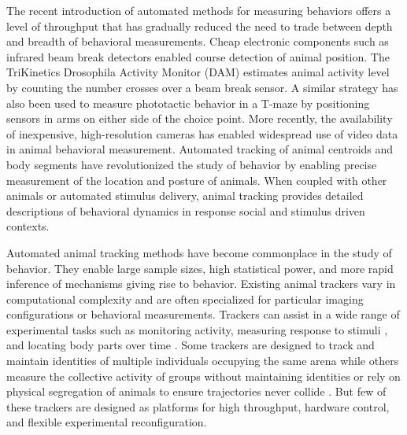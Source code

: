 \documentclass[12pt,letterpaper]{article}
\begin{document}
The recent introduction of automated methods for measuring behaviors offers a level of throughput that has gradually reduced the need to trade between depth and breadth of behavioral measurements. Cheap electronic components such as infrared beam break detectors enabled course detection of animal position. The TriKinetics Drosophila Activity Monitor (DAM) estimates animal activity level by counting the number crosses over a beam break sensor. A similar strategy has also been used to measure phototactic behavior in a T-maze by positioning sensors in arms on either side of the choice point. More recently, the availability of inexpensive, high-resolution cameras has enabled widespread use of video data in animal behavioral measurement. Automated tracking of animal centroids and body segments have revolutionized the study of behavior by enabling precise measurement of the location and posture of animals. When coupled with other animals or automated stimulus delivery, animal tracking provides detailed descriptions of behavioral dynamics in response social and stimulus driven contexts. 

Automated animal tracking methods have become commonplace in the study of behavior. They enable large sample sizes, high statistical power, and more rapid inference of mechanisms giving rise to behavior. Existing animal trackers vary in computational complexity and are often specialized for particular imaging configurations or behavioral measurements. Trackers can assist in a wide range of experimental tasks such as monitoring activity, measuring response to stimuli \cite{Fry_TrackFly_2008,Donelson_High_2012}, and locating body parts over time \cite{Mathis_DeepLabCut_2018,Pereira_Fast_2018}. Some trackers are designed to track and maintain identities of multiple individuals occupying the same arena \cite{Prez-Escudero_idTracker_2014,Eyjolfsdottir_Detecting_2014,Rodriguez_ToxId_2017,romero-ferrero_2019} while others measure the collective activity of groups without maintaining identities or rely on physical segregation of animals to ensure trajectories never collide \cite{Ramot_The_2008,Swierczek_High_2011,Itskovits_A_2017,Scaplen_Automated_2019}. But few of these trackers are designed as platforms for high throughput, hardware control, and flexible experimental reconfiguration. 
\end{document}
